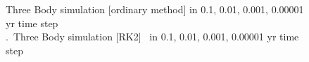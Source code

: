 \documentclass{article}
\begin{document}
\begin{figure}[h]
{        \label{0.01} 
    }
    \caption{Three Body simulation [ordinary method] in 0.1, 0.01, 0.001, 0.00001 yr time step\\
    .\qquad \qquad \ Three Body simulation [RK2] \qquad \qquad \quad \ in 0.1, 0.01, 0.001, 0.00001 yr time step}
    \label{fig:3}
\end{figure}
\end{document}
